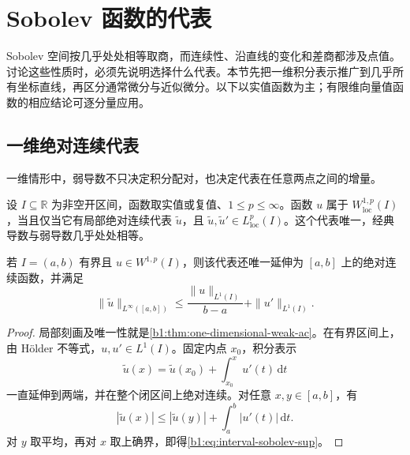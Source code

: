 \section{Sobolev 函数的代表}
\label{b1:sec:2104}

Sobolev 空间按几乎处处相等取商，而连续性、沿直线的变化和差商都涉及点值。讨论这些性质时，必须先说明选择什么代表。本节先把一维积分表示推广到几乎所有坐标直线，再区分通常微分与近似微分。以下以实值函数为主；有限维向量值函数的相应结论可逐分量应用。


\subsection{一维绝对连续代表}
\label{b1:subsec:210401}

一维情形中，弱导数不只决定积分配对，也决定代表在任意两点之间的增量。

\begin{proposition}\label{b1:prop:sobolev-interval-representative}
设 \(I\subseteq\mathbb R\) 为非空开区间，函数取实值或复值、\(1\leq p\leq\infty\)。函数 \(u\) 属于 \(W^{1,p}_{\mathrm{loc}}(I)\)，当且仅当它有局部绝对连续代表 \(\widetilde u\)，且 \(\widetilde u,\widetilde u'\in L^p_{\mathrm{loc}}(I)\)。这个代表唯一，经典导数与弱导数几乎处处相等。

\ProseParagraphBreak

若 \(I=(a,b)\) 有界且 \(u\in W^{1,p}(I)\)，则该代表还唯一延伸为 \([a,b]\) 上的绝对连续函数，并满足
\begin{equation}\label{b1:eq:interval-sobolev-sup}
 \|\widetilde u\|_{L^\infty([a,b])}
 \leq\dfrac{\|u\|_{L^1(I)}}{b-a}+\|u'\|_{L^1(I)}.
\end{equation}
\end{proposition}
\begin{proof}
局部刻画及唯一性就是\cref{b1:thm:one-dimensional-weak-ac}。在有界区间上，由 Hölder 不等式，\(u,u'\in L^1(I)\)。固定内点 \(x_0\)，积分表示
\[
 \widetilde u(x)=\widetilde u(x_0)+\int_{x_0}^x u'(t)\,\mathrm dt
\]
一直延伸到两端，并在整个闭区间上绝对连续。对任意 \(x,y\in[a,b]\)，有
\[
 |\widetilde u(x)|\leq|\widetilde u(y)|+\int_a^b|u'(t)|\,\mathrm dt.
\]
对 \(y\) 取平均，再对 \(x\) 取上确界，即得\eqref{b1:eq:interval-sobolev-sup}。
\end{proof}

